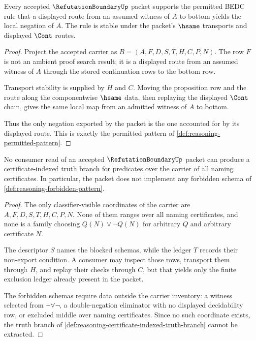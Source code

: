 \begin{theorem}
\label{thm:refutation-boundary-permitted-negation-sound}
Every accepted $\RefutationBoundaryUp$ packet supports the permitted BEDC rule that a displayed route from an assumed witness of $A$ to bottom yields the local negation of $A$. The rule is stable under the packet's $\hsame$ transports and displayed $\Cont$ routes.
\end{theorem}
\begin{proof}
Project the accepted carrier as $B=(A,F,D,S,T,H,C,P,N)$. The row $F$ is not an ambient proof search result; it is a displayed route from an assumed witness of $A$ through the stored continuation rows to the bottom row.

Transport stability is supplied by $H$ and $C$. Moving the proposition row and the route along the componentwise $\hsame$ data, then replaying the displayed $\Cont$ chain, gives the same local map from an admitted witness of $A$ to bottom.

Thus the only negation exported by the packet is the one accounted for by its displayed route. This is exactly the permitted pattern of \autoref{def:reasoning-permitted-pattern}.
\end{proof}

\begin{theorem}
\label{thm:refutation-boundary-forbidden-truth-branch-exclusion}
No consumer read of an accepted $\RefutationBoundaryUp$ packet can produce a certificate-indexed truth branch for predicates over the carrier of all naming certificates. In particular, the packet does not implement any forbidden schema of \autoref{def:reasoning-forbidden-pattern}.
\end{theorem}
\begin{proof}
The only classifier-visible coordinates of the carrier are $A,F,D,S,T,H,C,P,N$. None of them ranges over all naming certificates, and none is a family choosing $Q(N)\vee\neg Q(N)$ for arbitrary $Q$ and arbitrary certificate $N$.

The descriptor $S$ names the blocked schemas, while the ledger $T$ records their non-export condition. A consumer may inspect those rows, transport them through $H$, and replay their checks through $C$, but that yields only the finite exclusion ledger already present in the packet.

The forbidden schemas require data outside the carrier inventory: a witness selected from $\neg\forall\neg$, a double-negation eliminator with no displayed decidability row, or excluded middle over naming certificates. Since no such coordinate exists, the truth branch of \autoref{def:reasoning-certificate-indexed-truth-branch} cannot be extracted.
\end{proof}

